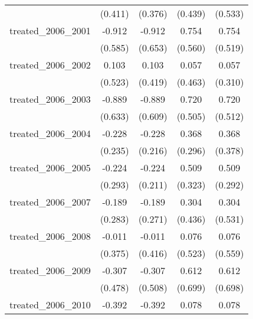 {\begin{tabular}{l*{4}{c}}
            &     (0.411)         &     (0.376)         &     (0.439)         &     (0.533)         \\
[1em]
treated\_2006\_2001&      -0.912         &      -0.912         &       0.754         &       0.754         \\
            &     (0.585)         &     (0.653)         &     (0.560)         &     (0.519)         \\
[1em]
treated\_2006\_2002&       0.103         &       0.103         &       0.057         &       0.057         \\
            &     (0.523)         &     (0.419)         &     (0.463)         &     (0.310)         \\
[1em]
treated\_2006\_2003&      -0.889         &      -0.889         &       0.720         &       0.720         \\
            &     (0.633)         &     (0.609)         &     (0.505)         &     (0.512)         \\
[1em]
treated\_2006\_2004&      -0.228         &      -0.228         &       0.368         &       0.368         \\
            &     (0.235)         &     (0.216)         &     (0.296)         &     (0.378)         \\
[1em]
treated\_2006\_2005&      -0.224         &      -0.224         &       0.509         &       0.509         \\
            &     (0.293)         &     (0.211)         &     (0.323)         &     (0.292)         \\
[1em]
treated\_2006\_2007&      -0.189         &      -0.189         &       0.304         &       0.304         \\
            &     (0.283)         &     (0.271)         &     (0.436)         &     (0.531)         \\
[1em]
treated\_2006\_2008&      -0.011         &      -0.011         &       0.076         &       0.076         \\
            &     (0.375)         &     (0.416)         &     (0.523)         &     (0.559)         \\
[1em]
treated\_2006\_2009&      -0.307         &      -0.307         &       0.612         &       0.612         \\
            &     (0.478)         &     (0.508)         &     (0.699)         &     (0.698)         \\
[1em]
treated\_2006\_2010&      -0.392         &      -0.392         &       0.078         &       0.078         \\

\end{tabular}}
